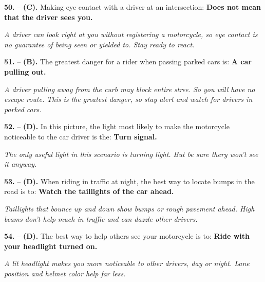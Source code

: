 \begin{minipage}{\linewidth}
\noindent\textbf{50.}  -- \textbf {(C).} Making eye contact with a driver at an intersection:  \textbf {Does not mean that the driver sees you.} \par \textit {A driver can look right at you without registering a motorcycle, so eye contact is no guarantee of being seen or yielded to. Stay ready to react.} \\
\end{minipage}

\begin{minipage}{\linewidth}
\noindent\textbf{51.}  -- \textbf {(B).} The greatest danger for a rider when passing parked cars is:  \textbf {A car pulling out.} \par \textit {A driver pulling away from the curb may block entire stree. So you will have no escape route. This is the greatest danger, so stay alert and watch for drivers in parked cars.} \\
\end{minipage}

\begin{minipage}{\linewidth}
\noindent\textbf{52.}  -- \textbf {(D).} In this picture, the light most likely to make the motorcycle noticeable to the car driver is the:  \textbf {Turn signal.} \par \textit {The only useful light in this scenario is turning light. But be sure thery won't see it anyway.} \\
\end{minipage}

\begin{minipage}{\linewidth}
\noindent\textbf{53.}  -- \textbf {(D).} When riding in traffic at night, the best way to locate bumps in the road is to:  \textbf {Watch the taillights of the car ahead.} \par \textit {Taillights that bounce up and down show bumps or rough pavement ahead. High beams don't help much in traffic and can dazzle other drivers.} \\
\end{minipage}

\begin{minipage}{\linewidth}
\noindent\textbf{54.}  -- \textbf {(D).} The best way to help others see your motorcycle is to:  \textbf {Ride with your headlight turned on.} \par \textit {A lit headlight makes you more noticeable to other drivers, day or night. Lane position and helmet color help far less.} \\
\end{minipage}

